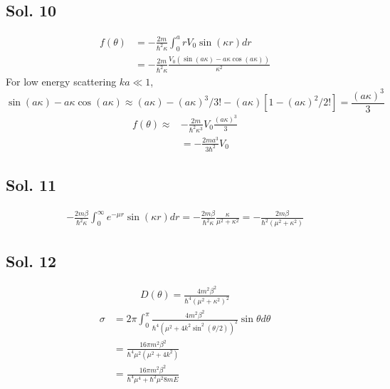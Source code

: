 \subsection*{Sol. 10}
\begin{align*}
    f(\theta)
     & =-\frac{2m}{\hbar^2\kappa}
    \int_0^a
    rV_0\sin(\kappa r)dr \\
     & =
    -\frac{2m}{\hbar^2\kappa}
    \frac{V_{0} \left(\sin\left(a{\kappa}\right) - a{\kappa} \cos\left(a{\kappa}\right)\right)}{{\kappa}^{2}}
\end{align*}
For low energy scattering $ka\ll 1$,
$$
    \sin(a\kappa) - a\kappa\cos(a\kappa)
    \approx (a\kappa) - (a\kappa )^3/3!
    -(a\kappa)[1 - (a\kappa)^2/2!]
    =\frac{(a\kappa)^3}{3}
$$
\begin{align*}
    f(\theta) \approx &
    -\frac{2m}{\hbar^2\kappa^3}
    V_0
    \frac{(a\kappa)^3}{3} \\
                      & =-
    \frac{2ma^3}{3\hbar^2}
    V_0
\end{align*}

\subsection*{Sol. 11}
\begin{align*}
    -\frac{2m\beta}{\hbar^2\kappa}
    \int_0^\infty
    e^{-\mu r}\sin(\kappa r)dr
    =
    -\frac{2m\beta}{\hbar^2\kappa}\frac{\kappa}{\mu^2+\kappa^2}
    =-\frac{2m\beta}{\hbar^2(\mu^2+\kappa^2)}
\end{align*}

\subsection*{Sol. 12}
\begin{align*}
    D(\theta) =
    \frac{4m^2\beta^2}{\hbar^4(\mu^2+\kappa^2)^2}
\end{align*}
\begin{align*}
    \sigma & =
    2\pi\int_0^\pi
    \frac{4m^2\beta^2}{\hbar^4(\mu^2+4k^2\sin^2(\theta/2))^2}\sin\theta d\theta \\
           & =\frac{16\pi m^{2} {\beta}^{2}}{\hbar^{4} {\mu}^{2} \left({\mu}^{2} + 4k^{2}\right)} \\
           & =
    \frac{16\pi m^{2} {\beta}^{2}}{ \hbar^{4} {\mu}^{4} +
        \hbar^{2} {\mu}^{2}8mE}
\end{align*}

